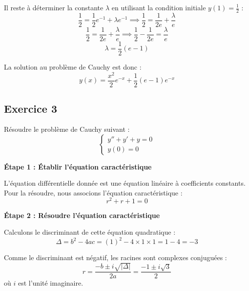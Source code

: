 \documentclass{article}
\begin{document}
Il reste à déterminer la constante $\lambda$ en utilisant la condition initiale $y(1) = \frac{1}{2}$ :
\begin{equation*}
\frac{1}{2} = \frac{1}{2}e^{-1} + \lambda e^{-1} \implies \frac{1}{2} = \frac{1}{2e} + \frac{\lambda}{e}
\end{equation*}
\begin{equation*}
\frac{1}{2} = \frac{1}{2e} + \frac{\lambda}{e} \implies \frac{1}{2} - \frac{1}{2e} = \frac{\lambda}{e}
\end{equation*}
\begin{equation*}
\lambda = \frac{1}{2}(e - 1)
\end{equation*}

La solution au problème de Cauchy est donc :
\begin{equation*}
y(x) = \frac{x^2}{2}e^{-x} + \frac{1}{2}(e - 1)e^{-x}
\end{equation*}

\subsection{Exercice 3}
Résoudre le problème de Cauchy suivant :
\begin{equation*}
\begin{cases}
    y'' + y' + y = 0  \\
    y(0)=0
\end{cases}
\end{equation*}

\textbf{Étape 1 : Établir l'équation caractéristique}

L'équation différentielle donnée est une équation linéaire à coefficients constants. Pour la résoudre, nous associons l'équation caractéristique :
\begin{equation*}
r^2 + r + 1 = 0
\end{equation*}

\textbf{Étape 2 : Résoudre l'équation caractéristique}

Calculons le discriminant de cette équation quadratique :
\begin{equation*}
\Delta = b^2 - 4ac = (1)^2 - 4 \times 1 \times 1 = 1 - 4 = -3
\end{equation*}

Comme le discriminant est négatif, les racines sont complexes conjuguées :
\begin{equation*}
r = \frac{-b \pm i\sqrt{|\Delta|}}{2a} = \frac{-1 \pm i\sqrt{3}}{2}
\end{equation*}
où \( i \) est l'unité imaginaire.
\end{document}
